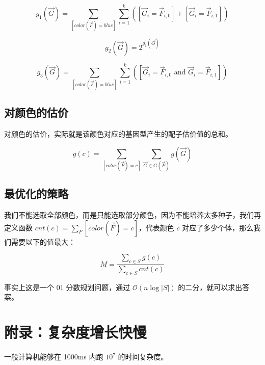 \documentclass[12pt]{article} %
\begin{document}
$$g_1(\vec G)=\sum_{[color(\vec F)=blue]} \sum_{i=1}^k ([\vec G_i=\vec F_{i,0}]+[\vec G_i=\vec F_{i,1}])$$

$$g_2(\vec G)=2^{g_1(\vec G)}$$

$$g_3(\vec G)=\sum_{[color(\vec F)=blue]} \sum_{i=1}^k ([\vec G_i=\vec F_{i,0} \text{ and } \vec G_i=\vec F_{i,1}])$$

\subsection{对颜色的估价}

对颜色的估价，实际就是该颜色对应的基因型产生的配子估价值的总和。

$$g(c)=\sum_{[color(\vec F)=c]} \sum_{\vec G \in G(\vec F)} g(\vec G)$$

\subsection{最优化的策略}

我们不能选取全部颜色，而是只能选取部分颜色，因为不能培养太多种子，我们再定义函数 $cnt(c)=\sum_F [color(\vec F)=c]$，代表颜色 $c$ 对应了多少个体，那么我们需要以下的值最大：

$$M=\frac{\sum_{c \in S} g(c)}{\sum_{c\in S}{cnt(c)}}$$

事实上这是一个 01 分数规划问题，通过 $\mathcal O(n \log |S|)$ 的二分，就可以求出答案。

\section{附录：复杂度增长快慢}

\begin{center}
\end{center}

一般计算机能够在 1000ms 内跑 $10^7$ 的时间复杂度。

\newpage

\end{document}
